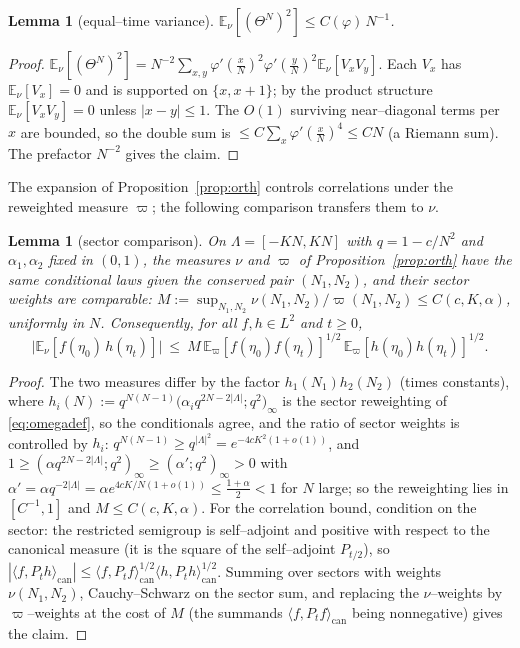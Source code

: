 \documentclass[11pt]{article}
\theoremstyle{plain}
\newtheorem{lemma}[theorem]{Lemma}
\theoremstyle{definition}
\theoremstyle{remark}
\newcommand{\E}{\mathbb{E}}\newcommand{\PP}{\mathbb{P}}\newcommand{\dd}{\,\mathrm{d}}
\begin{document}
\begin{lemma}[equal--time variance]\label{lem:eqvar}
$\E_\nu[(\Theta^N)^2]\le C(\varphi)\,N^{-1}$.
\end{lemma}
\begin{proof}
$\E_\nu[(\Theta^N)^2]=N^{-2}\sum_{x,y}\varphi'(\tfrac xN)^2\varphi'(\tfrac yN)^2\E_\nu[V_xV_y]$.
Each $V_x$ has $\E_\nu[V_x]=0$ and is supported on $\{x,x+1\}$; by the product structure
$\E_\nu[V_xV_y]=0$ unless $|x-y|\le1$. The $O(1)$ surviving near--diagonal terms per $x$
are bounded, so the double sum is $\le C\sum_x\varphi'(\tfrac xN)^4\le CN$ (a Riemann
sum). The prefactor $N^{-2}$ gives the claim.
\end{proof}

The expansion of Proposition~\ref{prop:orth} controls correlations under the
reweighted measure $\varpi$; the following comparison transfers them to $\nu$.

\begin{lemma}[sector comparison]\label{lem:sector}
On $\Lambda=[-KN,KN]$ with $q=1-c/N^2$ and $\alpha_1,\alpha_2$ fixed in $(0,1)$, the
measures $\nu$ and $\varpi$ of Proposition~\ref{prop:orth} have the same conditional
laws given the conserved pair $(N_1,N_2)$, and their sector weights are comparable:
$M:=\sup_{N_1,N_2}\nu(N_1,N_2)/\varpi(N_1,N_2)\le C(c,K,\alpha)$, uniformly in $N$.
Consequently, for all $f,h\in L^2$ and $t\ge0$,
\[
  \big|\E_\nu[f(\eta_0)\,h(\eta_t)]\big|\ \le\ M\,
  \E_\varpi[f(\eta_0)f(\eta_t)]^{1/2}\,\E_\varpi[h(\eta_0)h(\eta_t)]^{1/2}.
\]
\end{lemma}
\begin{proof}
The two measures differ by the factor $h_1(N_1)h_2(N_2)$ (times constants), where
$h_i(N):=q^{N(N-1)}\big(\alpha_i q^{2N-2|\Lambda|};q^2\big)_\infty$ is the sector
reweighting of \eqref{eq:omegadef}, so the conditionals agree, and the ratio of sector weights is
controlled by $h_i$: $q^{N(N-1)}\ge q^{|\Lambda|^2}=e^{-4cK^2(1+o(1))}$, and
$1\ge(\alpha q^{2N-2|\Lambda|};q^2)_\infty\ge(\alpha';q^2)_\infty>0$ with
$\alpha'=\alpha q^{-2|\Lambda|}=\alpha e^{4cK/N(1+o(1))}\le\tfrac{1+\alpha}2<1$ for
$N$ large; so the reweighting lies in $[C^{-1},1]$ and $M\le C(c,K,\alpha)$. For the
correlation bound, condition on the sector: the restricted semigroup is
self--adjoint and positive with respect to the canonical measure (it is the square
of the self--adjoint $P_{t/2}$), so
$|\langle f,P_th\rangle_{\mathrm{can}}|\le
\langle f,P_tf\rangle_{\mathrm{can}}^{1/2}\langle h,P_th\rangle_{\mathrm{can}}^{1/2}$.
Summing over sectors with weights $\nu(N_1,N_2)$, Cauchy--Schwarz on the sector sum,
and replacing the $\nu$--weights by $\varpi$--weights at the cost of $M$ (the
summands $\langle f,P_tf\rangle_{\mathrm{can}}$ being nonnegative) gives the claim.
\end{proof}
\end{document}
